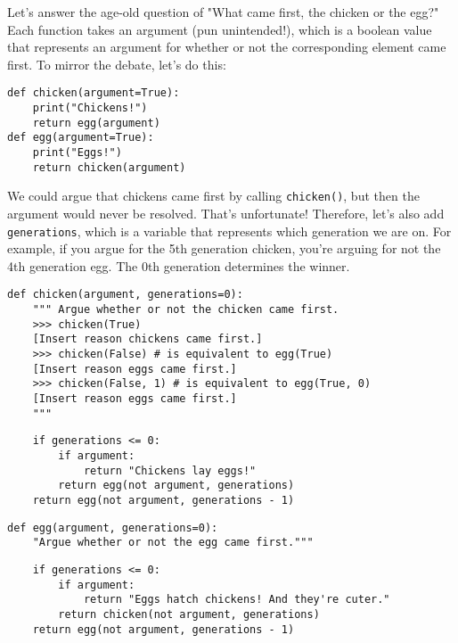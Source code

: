 \question Let's answer the age-old question of "What came first, the chicken or
the egg?"  Each function takes an argument (pun unintended!), which is a boolean
value that represents an argument for whether or not the corresponding element
came first.  To mirror the debate, let's do this:
\begin{lstlisting}
def chicken(argument=True):
    print("Chickens!")
    return egg(argument)
def egg(argument=True):
    print("Eggs!")
    return chicken(argument)
\end{lstlisting}
We could argue that chickens came first by calling {\tt chicken()}, but then the
argument would never be resolved. That's unfortunate! Therefore, let's also add
{\tt generations}, which is a variable that represents which generation we are
on. For example, if you argue for the 5th generation chicken, you're arguing for
not the 4th generation egg.  The 0th generation determines the winner.

\begin{lstlisting}
def chicken(argument, generations=0):
    """ Argue whether or not the chicken came first.
    >>> chicken(True)
    [Insert reason chickens came first.]
    >>> chicken(False) # is equivalent to egg(True)
    [Insert reason eggs came first.]
    >>> chicken(False, 1) # is equivalent to egg(True, 0)
    [Insert reason eggs came first.]
    """
\end{lstlisting}
\begin{solution}[1.2in]
\begin{lstlisting}
    if generations <= 0:
        if argument:
            return "Chickens lay eggs!"
        return egg(not argument, generations)
    return egg(not argument, generations - 1)
\end{lstlisting}
\end{solution}
\begin{lstlisting}
def egg(argument, generations=0):
    "Argue whether or not the egg came first."""
\end{lstlisting}
\begin{solution}[1.2in]
\begin{lstlisting}
    if generations <= 0:
        if argument:
            return "Eggs hatch chickens! And they're cuter."
        return chicken(not argument, generations)
    return egg(not argument, generations - 1)
\end{lstlisting}
\end{solution}
